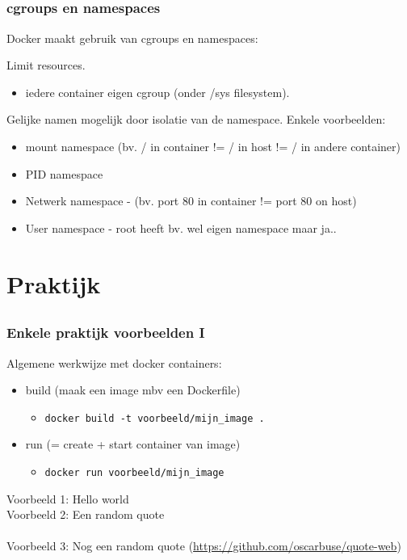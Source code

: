 \subsection{}
\begin{styleframe}
    \frametitle{cgroups en namespaces}
Docker maakt gebruik van cgroups en namespaces:
\pause
\begin{description}[namespacesbla]
	\item[cgroups] Limit resources.
	\pause
	\begin{itemize}
		\item iedere container eigen cgroup (onder /sys filesystem).
	\end{itemize}
	\pause
	\item[namespaces] Gelijke namen mogelijk door isolatie van de namespace. Enkele voorbeelden:
	\begin{itemize}
		\pause
		\item mount namespace (bv. / in container != / in host != / in andere container)
		\pause
		\item PID namespace
		\pause
		\item Netwerk namespace - (bv. port 80 in container != port 80 on host)
		\pause
		\item User namespace - root heeft bv. wel eigen namespace maar ja.. 
	\end{itemize}
\end{description}
\end{styleframe}

\section{Praktijk}
\subsection{}
\begin{styleframefrag}
    \frametitle{Enkele praktijk voorbeelden I}
Algemene werkwijze met docker containers:
\begin{itemize}
	\pause
	\item build (maak een image mbv een Dockerfile)
	\begin{itemize}
		\pause
		\item \verb!docker build -t voorbeeld/mijn_image .!
	\end{itemize}
	\pause
	\item run (= create + start container van image)
	\begin{itemize}
		\pause
		\item \verb!docker run voorbeeld/mijn_image!
	\end{itemize}
\end{itemize}
\pause
Voorbeeld 1: Hello world\\
\pause
Voorbeeld 2: Een random quote\\
\pause
~\\
Voorbeeld 3: Nog een random quote (\url{https://github.com/oscarbuse/quote-web})\\
\end{styleframefrag}

